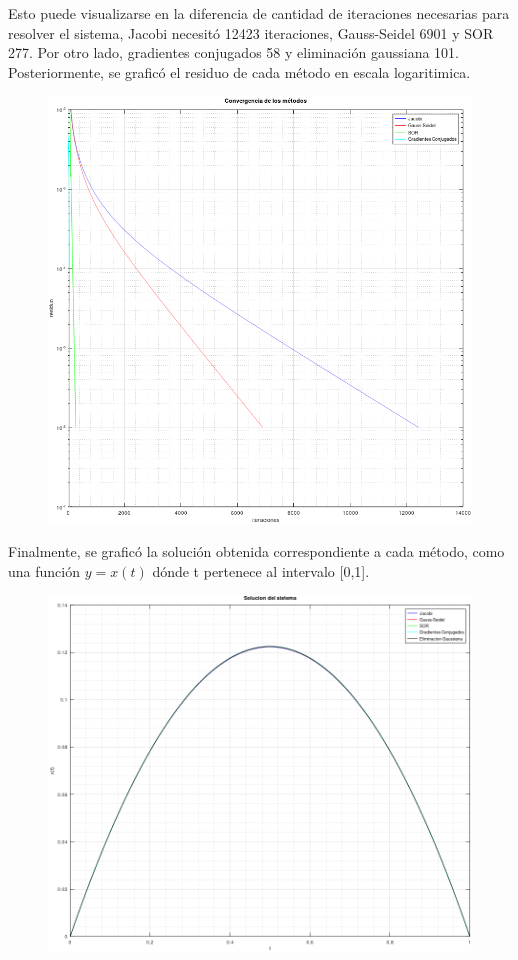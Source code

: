 \documentclass[11pt]{article}
\begin{document}
Esto puede visualizarse en la diferencia de cantidad de iteraciones necesarias para resolver el sistema,
Jacobi necesitó 12423 iteraciones, Gauss-Seidel 6901 y SOR 277. Por otro lado, gradientes conjugados 58 y eliminación
gaussiana 101. Posteriormente, se graficó el residuo de cada método en escala logaritimica.
\\
\begin{figure}[h]
	\includegraphics[scale=0.8]{ConvergenciaMetodos3}
\end{figure}

\newpage
Finalmente, se graficó la solución obtenida correspondiente a cada método, como una función $y=x(t)$
dónde t pertenece al intervalo [0,1].

\begin{figure}[h]
	\includegraphics[scale=0.7]{SolucionDelSistema.png}
\end{figure}
\end{document}
